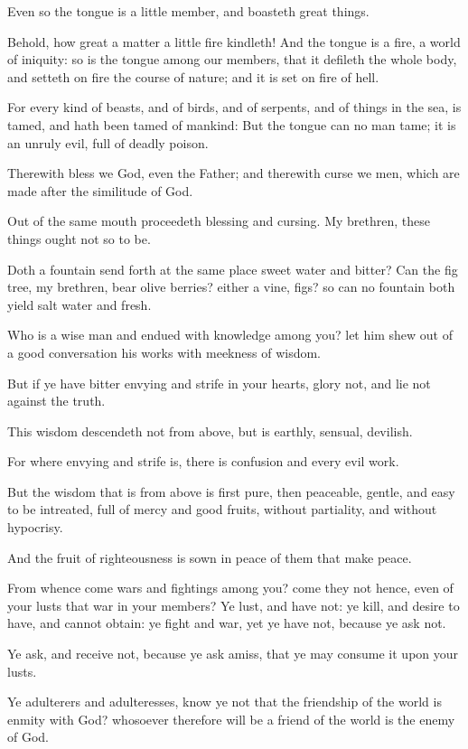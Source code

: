 \Verse Even so the tongue is a little member, and boasteth great things.

Behold, how great a matter a little fire kindleth!  \Verse And the tongue is a fire, a world of iniquity: so is the tongue among our members, that it defileth the whole body, and setteth on fire the course of nature; and it is set on fire of hell.

\Verse For every kind of beasts, and of birds, and of serpents, and of things in the sea, is tamed, and hath been tamed of mankind: \Verse But the tongue can no man tame; it is an unruly evil, full of deadly poison.

\Verse Therewith bless we God, even the Father; and therewith curse we men, which are made after the similitude of God.

\Verse Out of the same mouth proceedeth blessing and cursing. My brethren, these things ought not so to be.

\Verse Doth a fountain send forth at the same place sweet water and bitter?  \Verse Can the fig tree, my brethren, bear olive berries?  either a vine, figs? so can no fountain both yield salt water and fresh.

\Verse Who is a wise man and endued with knowledge among you? let him shew out of a good conversation his works with meekness of wisdom.

\Verse But if ye have bitter envying and strife in your hearts, glory not, and lie not against the truth.

\Verse This wisdom descendeth not from above, but is earthly, sensual, devilish.

\Verse For where envying and strife is, there is confusion and every evil work.

\Verse But the wisdom that is from above is first pure, then peaceable, gentle, and easy to be intreated, full of mercy and good fruits, without partiality, and without hypocrisy.

\Verse And the fruit of righteousness is sown in peace of them that make peace.


\Chapter
\Verse From whence come wars and fightings among you? come they not hence, even of your lusts that war in your members?  \Verse Ye lust, and have not: ye kill, and desire to have, and cannot obtain: ye fight and war, yet ye have not, because ye ask not.

\Verse Ye ask, and receive not, because ye ask amiss, that ye may consume it upon your lusts.

\Verse Ye adulterers and adulteresses, know ye not that the friendship of the world is enmity with God? whosoever therefore will be a friend of the world is the enemy of God.

